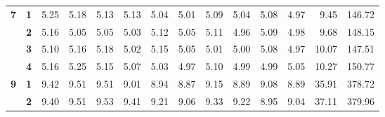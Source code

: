 \begin{table}[h!]
{\begin{tabular}{@{} ccrrrrrrrrrrrr}
\textbf{7}  & \textbf{1}                     & 5.25                             & 5.18                             & 5.13                             & 5.13                             & 5.04                             & 5.01                             & 5.09                             & 5.04                             & 5.08                             & 4.97                             & 9.45                            & 146.72                             \\
\textbf{}   & \textbf{2}                     & 5.16                             & 5.05                             & 5.05                             & 5.03                             & 5.12                             & 5.05                             & 5.11                             & 4.96                             & 5.09                             & 4.98                             & 9.68                            & 148.15                             \\
\textbf{}   & \textbf{3}                     & 5.10                             & 5.16                             & 5.18                             & 5.02                             & 5.15                             & 5.05                             & 5.01                             & 5.00                             & 5.08                             & 4.97                             & 10.07                           & 147.51                             \\
\textbf{}   & \textbf{4}                     & 5.16                             & 5.25                             & 5.15                             & 5.07                             & 5.03                             & 4.97                             & 5.10                             & 4.99                             & 4.99                             & 5.05                             & 10.27                           & 150.77                             \\
\textbf{9}  & \textbf{1}                     & 9.42                             & 9.51                             & 9.51                             & 9.01                             & 8.94                             & 8.87                             & 9.15                             & 8.89                             & 9.08                             & 8.89                             & 35.91                           & 378.72                             \\
\textbf{}   & \textbf{2}                     & 9.40                             & 9.51                             & 9.53                             & 9.41                             & 9.21                             & 9.06                             & 9.33                             & 9.22                             & 8.95                             & 9.04                             & 37.11                           & 379.96                             \\

\end{tabular}}
\end{table}
